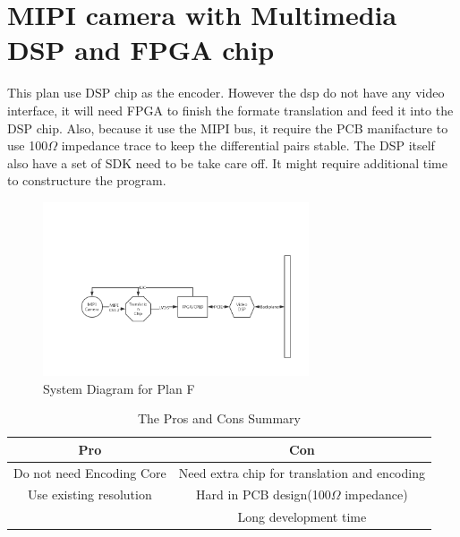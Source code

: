 \documentclass[12pt,article]{memoir}
\begin{document}
\section{MIPI camera with Multimedia DSP and FPGA chip}
This plan use DSP chip as the encoder. However the dsp do not have any video interface, it will need FPGA to finish the formate translation and feed it into the DSP chip. Also, because it use the MIPI bus, it require the PCB manifacture to use 100$\Omega$ impedance trace to keep the differential pairs stable. The DSP itself also have a set of SDK need to be take care off. It might require additional time to constructure the program.
\begin{figure}[htp]
\begin{center}
\includegraphics[width=0.7\textwidth]{img/DR00002_Plan5-2.png}
 \caption{System Diagram for Plan F}	
\end{center}
\end{figure}
\begin{table}[H]
	\centering
		\begin{tabu}{c | c }
		Pro & Con \\ \hline
		Do not need Encoding Core & Need extra chip for translation and encoding\\
		Use existing resolution & Hard in PCB design(100$\Omega$ impedance) \\
		 & Long development time \\
		\end{tabu}
	\caption{The Pros and Cons Summary}
\end{table}
\newpage
\end{document}
